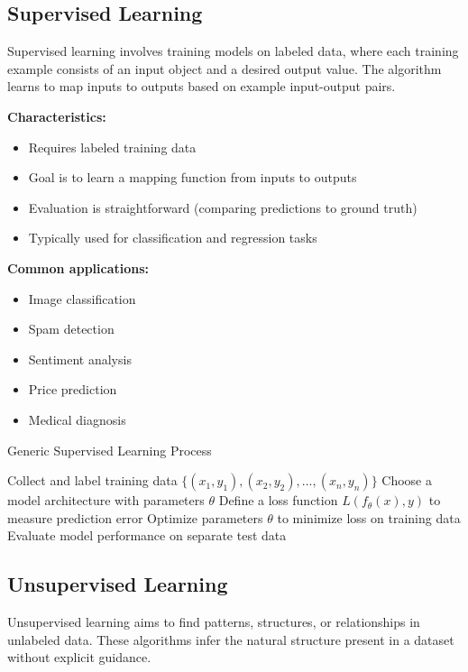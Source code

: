 \documentclass[11pt,a4paper]{report}
\begin{document}
\subsection{Supervised Learning}
Supervised learning involves training models on labeled data, where each training example consists of an input object and a desired output value. The algorithm learns to map inputs to outputs based on example input-output pairs.

\textbf{Characteristics:}
\begin{itemize}
    \item Requires labeled training data
    \item Goal is to learn a mapping function from inputs to outputs
    \item Evaluation is straightforward (comparing predictions to ground truth)
    \item Typically used for classification and regression tasks
\end{itemize}

\textbf{Common applications:}
\begin{itemize}
    \item Image classification
    \item Spam detection
    \item Sentiment analysis
    \item Price prediction
    \item Medical diagnosis
\end{itemize}

\begin{algorithm}
\caption{Generic Supervised Learning Process}
\begin{algorithmic}[1]
\STATE Collect and label training data $\{(x_1, y_1), (x_2, y_2), ..., (x_n, y_n)\}$
\STATE Choose a model architecture with parameters $\theta$
\STATE Define a loss function $L(f_\theta(x), y)$ to measure prediction error
\STATE Optimize parameters $\theta$ to minimize loss on training data
\STATE Evaluate model performance on separate test data
\end{algorithmic}
\end{algorithm}

\subsection{Unsupervised Learning}
Unsupervised learning aims to find patterns, structures, or relationships in unlabeled data. These algorithms infer the natural structure present in a dataset without explicit guidance.
\end{document}
